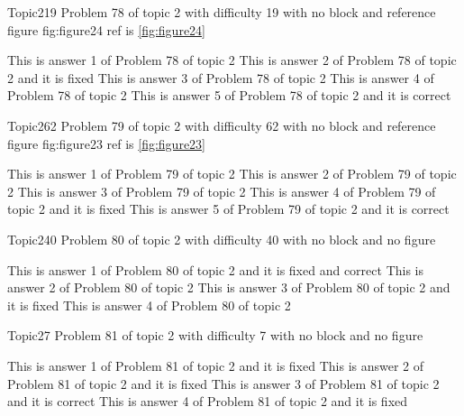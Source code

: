 \documentclass[master]{exam}
\begin{document}
\begin{problem}{Topic2}{19}
	Problem 78 of topic 2 with difficulty 19 with no block and reference figure fig:figure24 ref is \ref{fig:figure24}
	\begin{answers}
		\answer This is answer 1 of Problem 78 of topic 2 
		\answer[fixed] This is answer 2 of Problem 78 of topic 2 and it is fixed
		\answer This is answer 3 of Problem 78 of topic 2 
		\answer This is answer 4 of Problem 78 of topic 2 
		\answer[correct] This is answer 5 of Problem 78 of topic 2 and it is correct
	\end{answers}
\end{problem}

\begin{problem}{Topic2}{62}
	Problem 79 of topic 2 with difficulty 62 with no block and reference figure fig:figure23 ref is \ref{fig:figure23}
	\begin{answers}
		\answer This is answer 1 of Problem 79 of topic 2 
		\answer This is answer 2 of Problem 79 of topic 2 
		\answer This is answer 3 of Problem 79 of topic 2 
		\answer[fixed] This is answer 4 of Problem 79 of topic 2 and it is fixed
		\answer[correct] This is answer 5 of Problem 79 of topic 2 and it is correct
	\end{answers}
\end{problem}

\begin{problem}{Topic2}{40}
	Problem 80 of topic 2 with difficulty 40 with no block and no figure
	\begin{answers}
		 This is answer 1 of Problem 80 of topic 2 and it is fixed and correct
		\answer This is answer 2 of Problem 80 of topic 2 
		\answer[fixed] This is answer 3 of Problem 80 of topic 2 and it is fixed
		\answer This is answer 4 of Problem 80 of topic 2 
	\end{answers}
\end{problem}

\begin{problem}{Topic2}{7}
	Problem 81 of topic 2 with difficulty 7 with no block and no figure
	\begin{answers}
		\answer[fixed] This is answer 1 of Problem 81 of topic 2 and it is fixed
		\answer[fixed] This is answer 2 of Problem 81 of topic 2 and it is fixed
		\answer[correct] This is answer 3 of Problem 81 of topic 2 and it is correct
		\answer[fixed] This is answer 4 of Problem 81 of topic 2 and it is fixed
	\end{answers}
\end{problem}
\end{document}
